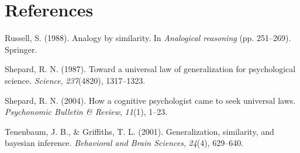 \documentclass[english,doc]{apa6}
\begin{document}
\hypertarget{references}{%
\section{References}\label{references}}

\hypertarget{refs}{}
\leavevmode\hypertarget{ref-russell1988analogy}{}%
Russell, S. (1988). Analogy by similarity. In \emph{Analogical reasoning} (pp. 251--269). Springer.

\leavevmode\hypertarget{ref-shepard1987toward}{}%
Shepard, R. N. (1987). Toward a universal law of generalization for psychological science. \emph{Science}, \emph{237}(4820), 1317--1323.

\leavevmode\hypertarget{ref-shepard2004cognitive}{}%
Shepard, R. N. (2004). How a cognitive psychologist came to seek universal laws. \emph{Psychonomic Bulletin \& Review}, \emph{11}(1), 1--23.

\leavevmode\hypertarget{ref-tenenbaum2001generalization}{}%
Tenenbaum, J. B., \& Griffiths, T. L. (2001). Generalization, similarity, and bayesian inference. \emph{Behavioral and Brain Sciences}, \emph{24}(4), 629--640.
\end{document}
